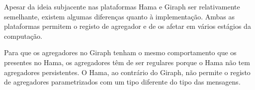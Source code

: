   Apesar da ideia subjacente nas plataformas Hama e Giraph ser 
relativamente semelhante, existem algumas diferenças quanto à implementação. 
Ambas as plataformas
  permitem o registo de agregador e de os afetar em vários estágios da computação. 
  
  Para que os agregadores no Giraph tenham o mesmo comportamento que os presentes no Hama, os agregadores têm de ser regulares porque o Hama não tem agregadores persistentes. O Hama, ao contrário do Giraph, não permite o registo de agregadores parametrizados com um tipo diferente do tipo das mensagens.
  

